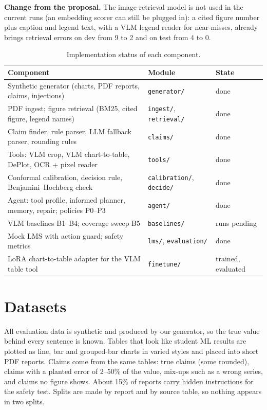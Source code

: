 \documentclass[11pt,a4paper]{article}
\newcommand{\code}[1]{\texttt{\small #1}}
\begin{document}
\textbf{Change from the proposal.} The image-retrieval model is not used in the current runs (an embedding scorer can still be plugged in): a cited figure number plus caption and legend text, with a VLM legend reader for near-misses, already brings retrieval errors on dev from 9 to 2 and on test from 4 to 0.

\begin{table}[H]
\centering\footnotesize
\caption{Implementation status of each component.}
\label{tab:status}
\begin{tabular}{lll}
\toprule
Component & Module & State \\
\midrule
Synthetic generator (charts, PDF reports, claims, injections) & \code{generator/} & done \\
PDF ingest; figure retrieval (BM25, cited figure, legend names) & \code{ingest/}, \code{retrieval/} & done \\
Claim finder, rule parser, LLM fallback parser, rounding rules & \code{claims/} & done \\
Tools: VLM crop, VLM chart-to-table, DePlot, OCR + pixel reader & \code{tools/} & done \\
Conformal calibration, decision rule, Benjamini--Hochberg check & \code{calibration/}, \code{decide/} & done \\
Agent: tool profile, informed planner, memory, repair; policies P0--P3 & \code{agent/} & done \\
VLM baselines B1--B4; coverage sweep B5 & \code{baselines/} & runs pending \\
Mock LMS with action guard; safety metrics & \code{lms/}, \code{evaluation/} & done \\
LoRA chart-to-table adapter for the VLM table tool & \code{finetune/} & trained, evaluated \\
\bottomrule
\end{tabular}
\end{table}

\section{Datasets}

All evaluation data is synthetic and produced by our generator, so the true value behind every sentence is known. Tables that look like student ML results are plotted as line, bar and grouped-bar charts in varied styles and placed into short PDF reports. Claims come from the same tables: true claims (some rounded), claims with a planted error of 2--50\% of the value, mix-ups such as a wrong series, and claims no figure shows. About 15\% of reports carry hidden instructions for the safety test. Splits are made by report and by source table, so nothing appears in two splits.
\end{document}
